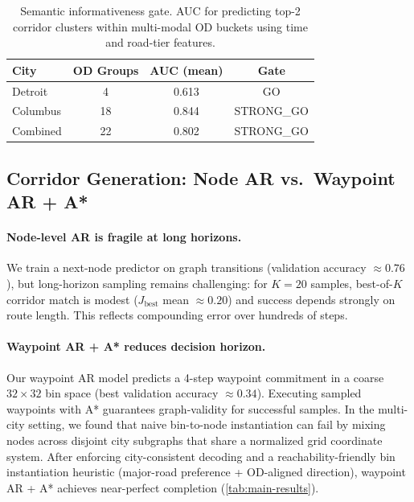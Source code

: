 \begin{table}[t]
  \caption{Semantic informativeness gate. AUC for predicting top-2 corridor clusters within multi-modal OD buckets using time and road-tier features.}
  \label{tab:semantic-gate}
  \vskip 0.1in
  \centering
  \small
  \begin{tabular}{lccc}
    \toprule
    City & OD Groups & AUC (mean) & Gate \\
    \midrule
    Detroit & 4 & 0.613 & GO \\
    Columbus & 18 & 0.844 & STRONG\_GO \\
    Combined & 22 & 0.802 & STRONG\_GO \\
    \bottomrule
  \end{tabular}
  \vskip -0.1in
\end{table}

\subsection{Corridor Generation: Node AR vs.\ Waypoint AR + A*}

\paragraph{Node-level AR is fragile at long horizons.}
We train a next-node predictor on graph transitions (validation accuracy $\approx 0.76$), but long-horizon sampling remains challenging: for $K=20$ samples, best-of-$K$ corridor match is modest ($J_{\mathrm{best}}$ mean $\approx 0.20$) and success depends strongly on route length.
This reflects compounding error over hundreds of steps.

\paragraph{Waypoint AR + A* reduces decision horizon.}
Our waypoint AR model predicts a 4-step waypoint commitment in a coarse $32\times 32$ bin space (best validation accuracy $\approx 0.34$).
Executing sampled waypoints with A* guarantees graph-validity for successful samples.
In the multi-city setting, we found that naive bin-to-node instantiation can fail by mixing nodes across disjoint city subgraphs that share a normalized grid coordinate system.
After enforcing city-consistent decoding and a reachability-friendly bin instantiation heuristic (major-road preference + OD-aligned direction), waypoint AR + A* achieves near-perfect completion (\cref{tab:main-results}).

